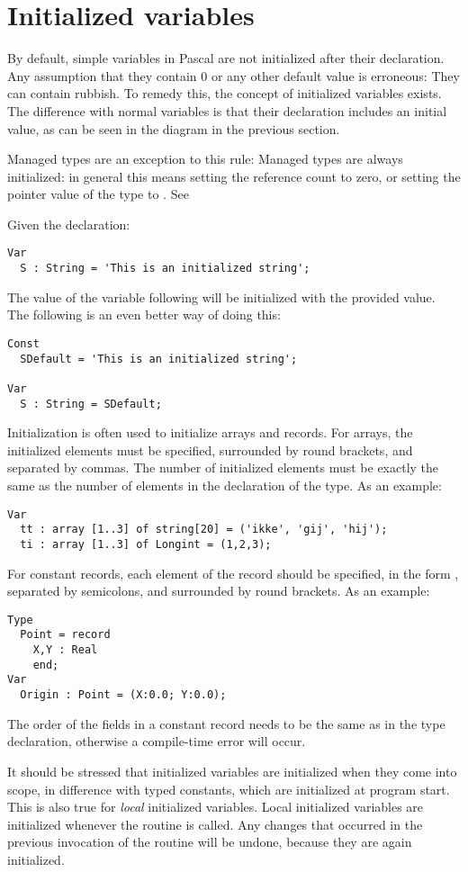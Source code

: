 \section{Initialized variables}
\label{se:initializedvars}
By default, simple variables in Pascal are not initialized after their declaration.
Any assumption that they contain 0 or any other default value is erroneous:
They can contain rubbish. To remedy this, the concept of initialized variables 
exists. The difference with normal variables is that their declaration includes 
an initial value, as can be seen in the diagram in the previous section.

Managed types are an exception to this rule: Managed types are always
initialized: in general this means setting the reference count to zero, or
setting the pointer value of the type to . See 

Given the declaration:
\begin{verbatim}
Var
  S : String = 'This is an initialized string';
\end{verbatim}
The value of the variable following will be initialized with the provided
value. The following is an even better way of doing this:
\begin{verbatim}
Const
  SDefault = 'This is an initialized string';

Var
  S : String = SDefault;
\end{verbatim}
Initialization is often used to initialize arrays and records. For arrays,
the initialized elements must be specified, surrounded by round brackets, and
separated by commas. The number of initialized elements must be exactly the 
same as the number of elements in the declaration of the type.
As an example:
\begin{verbatim}
Var
  tt : array [1..3] of string[20] = ('ikke', 'gij', 'hij');
  ti : array [1..3] of Longint = (1,2,3);
\end{verbatim}
For constant records, each element of the record should be specified, in
the form , separated by semicolons, and surrounded by round
brackets.
As an example:
\begin{verbatim}
Type
  Point = record
    X,Y : Real
    end;
Var
  Origin : Point = (X:0.0; Y:0.0);
\end{verbatim}
The order of the fields in a constant record needs to be the same as in the type 
declaration, otherwise a compile-time error will occur.

\begin{remark}
It should be stressed that initialized variables are initialized when they
come into scope, in difference with typed constants, which are initialized 
at program start.
This is also true for {\em local} initialized variables. Local initialized
variables are initialized whenever the routine is called. Any changes that
occurred in the previous invocation of the routine will be undone, because
they are again initialized.
\end{remark}

